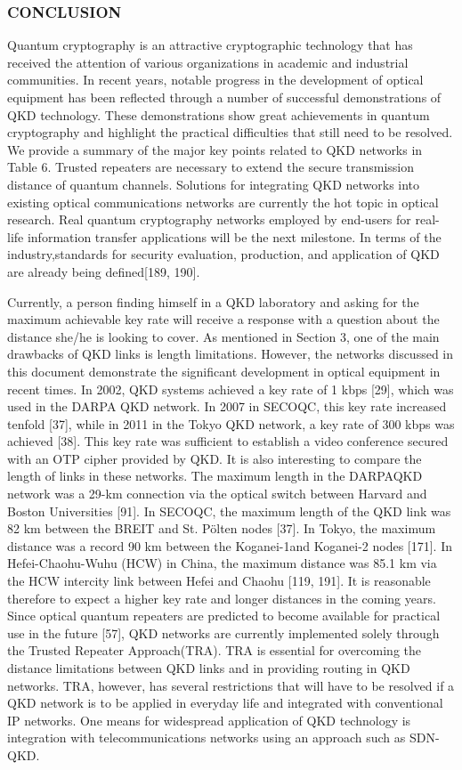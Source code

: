 \subsubsection{CONCLUSION}
Quantum cryptography is an attractive cryptographic technology that has received the attention of various organizations in academic and industrial communities. In recent years, notable progress in the development of optical equipment has been reflected through a number of successful demonstrations of QKD technology. These demonstrations show great achievements in quantum cryptography and highlight the practical difficulties that still need to be resolved.
We provide a summary of the major key points related to QKD networks in Table 6. Trusted repeaters are necessary to extend the secure transmission distance of quantum channels. Solutions for integrating QKD networks into existing optical communications networks are currently the hot topic in optical research. Real quantum cryptography networks employed by end-users for real-life information transfer applications will be the next milestone. In terms of the industry,standards for security evaluation, production, and application of QKD are already being defined[189, 190].

Currently, a person finding himself in a QKD laboratory and asking for the maximum achievable key rate will receive a response with a question about the distance she/he is looking to cover.
As mentioned in Section 3, one of the main drawbacks of QKD links is length limitations. However, the networks discussed in this document demonstrate the significant development in optical equipment in recent times. In 2002, QKD systems achieved a key rate of 1 kbps [29], which was used in the DARPA QKD network. In 2007 in SECOQC, this key rate increased tenfold [37], while in 2011 in the Tokyo QKD network, a key rate of 300 kbps was achieved [38]. This key rate was sufficient to establish a video conference secured with an OTP cipher provided by QKD. It is also interesting to compare the length of links in these networks. The maximum length in the DARPAQKD network was a 29-km connection via the optical switch between Harvard and Boston Universities [91]. In SECOQC, the maximum length of the QKD link was 82 km between the BREIT and St. Pölten nodes [37]. In Tokyo, the maximum distance was a record 90 km between the Koganei-1and Koganei-2 nodes [171]. In Hefei-Chaohu-Wuhu (HCW) in China, the maximum distance was
85.1 km via the HCW intercity link between Hefei and Chaohu [119, 191].
It is reasonable therefore to expect a higher key rate and longer distances in the coming years.
Since optical quantum repeaters are predicted to become available for practical use in the future [57], QKD networks are currently implemented solely through the Trusted Repeater Approach(TRA). TRA is essential for overcoming the distance limitations between QKD links and in providing routing in QKD networks. TRA, however, has several restrictions that will have to be resolved if a QKD network is to be applied in everyday life and integrated with conventional IP networks.
One means for widespread application of QKD technology is integration with telecommunications networks using an approach such as SDN-QKD.


